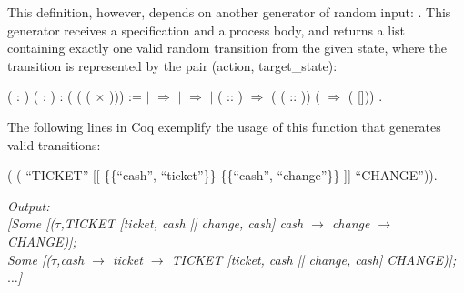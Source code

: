 This definition, however, depends on another generator of random input: . This generator receives a specification and a process body, and returns a list containing exactly one valid random transition from the given state, where the transition is represented by the pair (action, target\_state):

\begin{coqdoccode}
	\coqdocnoindent
	 \coqdoceol
	\coqdocindent{1.00em}
	( : )\coqdoceol
	\coqdocindent{1.00em}
	( : )\coqdoceol
	\coqdocindent{1.00em}
	:  ( ( ( \ensuremath{\times} ))) :=\coqdoceol
	\coqdocindent{1.00em}
	    \coqdoceol
	\coqdocindent{1.00em}
	\ensuremath{|}  \ensuremath{\Rightarrow}  \coqdoceol
	\coqdocindent{1.00em}
	\ensuremath{|}   \ensuremath{\Rightarrow}  \coqdoceol
	\coqdocindent{1.00em}
	\ensuremath{|}  ( :: ) \ensuremath{\Rightarrow}  (  ( :: )) (  \ensuremath{\Rightarrow}  ( []))\coqdoceol
	\coqdocindent{1.00em}
	.\coqdoceol
\end{coqdoccode}

The following lines in Coq exemplify the usage of this function that generates valid transitions:

\begin{coqdoccode}
	\coqdocnoindent
	 ( \coqdoceol
	\coqdocindent{1.00em}
	( ``TICKET'' [[ \{\{``cash'', ``ticket''\}\}  \{\{``cash'', ``change''\}\} ]] 	 ``CHANGE'')).\coqdoceol
\end{coqdoccode}

\begin{tabbing}
	\emph{Output:}\\
	\emph{[Some [($ \tau $,TICKET [{ticket, cash} || {change, cash}] cash $ \rightarrow $ change $ \rightarrow $ CHANGE)];}\\
	\emph{Some [($ \tau $,cash $ \rightarrow $ ticket $ \rightarrow $ TICKET [{ticket, cash} || {change, cash}] CHANGE)]; $\dots$]}
\end{tabbing}

